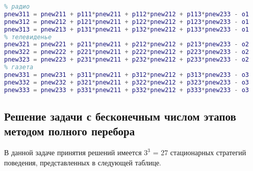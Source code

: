 \documentclass[14pt,a4paper,report]{report}
\begin{document}
\begin{lstlisting}[language={matlab}, caption={скрипт}, basicstyle=\ttfamily]
% 1 этап
% радио
pnew311 = pnew211 + p111*pnew211 + p112*pnew212 + p113*pnew233 - o1
pnew312 = pnew212 + p121*pnew211 + p122*pnew212 + p123*pnew233 - o1
pnew313 = pnew213 + p131*pnew211 + p132*pnew212 + p133*pnew233 - o1
% телевиденье
pnew321 = pnew221 + p211*pnew211 + p212*pnew212 + p213*pnew233 - o2
pnew322 = pnew222 + p221*pnew211 + p222*pnew212 + p223*pnew233 - o2
pnew323 = pnew223 + p231*pnew211 + p232*pnew212 + p233*pnew233 - o2
% газета
pnew331 = pnew231 + p311*pnew211 + p312*pnew212 + p313*pnew233 - o3
pnew332 = pnew232 + p321*pnew211 + p322*pnew212 + p323*pnew233 - o3
pnew333 = pnew233 + p331*pnew211 + p332*pnew212 + p333*pnew233 - o3
\end{lstlisting}

\subsection{Решение задачи с бесконечным числом этапов методом полного перебора}
В данной задаче принятия решений имеется $3^3$ = 27 стационарных стратегий поведения, представленных в следующей таблице.
\end{document}
